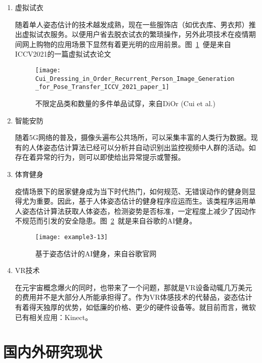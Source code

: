 \begin{enumerate}
\item 虚拟试衣

\qquad \quad 随着单人姿态估计的技术越发成熟，现在一些服饰店（如优衣库、男衣邦）推出虚拟试衣服务。以便用户省去脱衣试衣的繁琐操作，另外此项技术在疫情期间网上购物的应用场景下显然有着更光明的应用前景。图~\ref{piture:1}~便是来自ICCV2021的一篇虚拟试衣论文

\begin{figure}[h]
\centering
\texttt{[image: Cui\_Dressing\_in\_Order\_Recurrent\_Person\_Image\_Generation\_for\_Pose\_Transfer\_ICCV\_2021\_paper\_1]}
\caption{不限定品类和数量的多件单品试穿，来自DiOr (Cui et al.)}
\label{piture:1}
\end{figure}

\item 智能安防

\qquad \quad 随着5G网络的普及，摄像头遍布公共场所，可以采集丰富的人类行为数据。现有的人体姿态估计算法已经可以分析并自动识别出监控视频中人群的活动。如存在着异常的行为，则可以即使给出异常提示或警报。\cite{戴汉彬2021基于深度学习的人体姿态估计技术研究}

\item 体育健身

\qquad \quad 疫情场景下的居家健身成为当下时代热门，如何规范、无错误动作的健身则显得尤为重要。因此，基于人体姿态估计的健身程序应运而生。该类程序运用单人姿态估计算法获取人体姿态，检测姿势是否标准，一定程度上减少了因动作不规范而引发的安全隐患。图~\ref{piture:2}~就是来自谷歌的AI健身。

\begin{figure}[h]
\centering
\texttt{[image: example3-13]}
\caption{基于姿态估计的AI健身，来自谷歌官网}
\label{piture:2}
\end{figure}

\item VR技术

\qquad \quad 在元宇宙概念爆火的同时，也带来了一个问题，那就是VR设备动辄几万美元的费用并不是大部分人所能承担得了。作为VR体感技术的代替品，姿态估计有着得天独厚的优势，如低廉的价格、更少的硬件设备等。就目前而言，微软已有相关应用：Kinect\cite{zhang2012microsoft}。

\end{enumerate}

\section{国内外研究现状}

